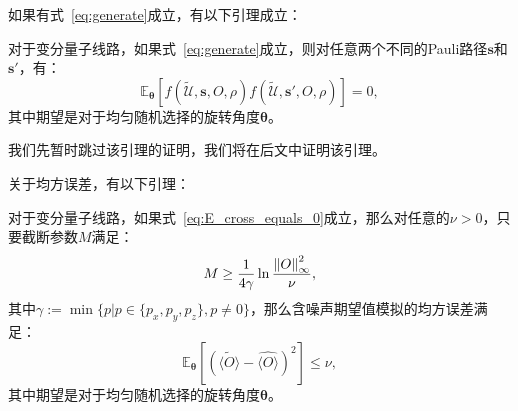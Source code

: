 如果有式~\eqref{eq:generate}成立，有以下引理成立：
\begin{lemma}\label{lemma:cross_items}
    对于变分量子线路，如果式~\eqref{eq:generate}成立，则对任意两个不同的Pauli路径$\bm{s}$和$\bm{s}'$，有：
    \begin{equation}\label{eq:E_cross_equals_0}
        \mathbb{E}_{\bm{\theta}}\left[f(\widetilde{\mathcal{U}},\bm{s},O,\rho)f(\widetilde{\mathcal{U}},\bm{s}',O,\rho)\right]=0,
    \end{equation}
    其中期望是对于均匀随机选择的旋转角度$\bm{\theta}$。
\end{lemma}
我们先暂时跳过该引理的证明，我们将在后文中证明该引理。

关于均方误差，有以下引理：
\begin{lemma}\label{lemma:MSE_l}
    对于变分量子线路，如果式~\eqref{eq:E_cross_equals_0}成立，那么对任意的$\nu > 0$，只要截断参数$M$满足：
    \begin{equation}
        M\geq\frac{1}{4\gamma}\ln{\frac{\norm{O}_\infty^2}{\nu}},
    \end{equation}
    其中$\gamma:=\min\{p|{p \in \{p_x,p_y,p_z\},p\neq 0}\}$，那么含噪声期望值模拟的均方误差满足：
    \begin{equation}
        \mathbb{E}_{\bm{\theta}}\left[\left(\widetilde{\langle O\rangle}-\widehat{\langle O\rangle}\right)^2\right]\leq\nu,
    \end{equation}
    其中期望是对于均匀随机选择的旋转角度$\bm{\theta}$。
\end{lemma}
